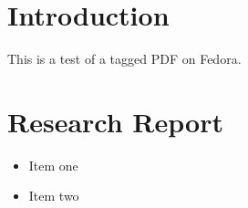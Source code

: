 \documentclass{article}
\begin{document}
\section{Introduction}
This is a test of a tagged PDF on Fedora.

\section{Research Report}


\begin{itemize}
    \item Item one
    \item Item two
\end{itemize}
\end{document}

